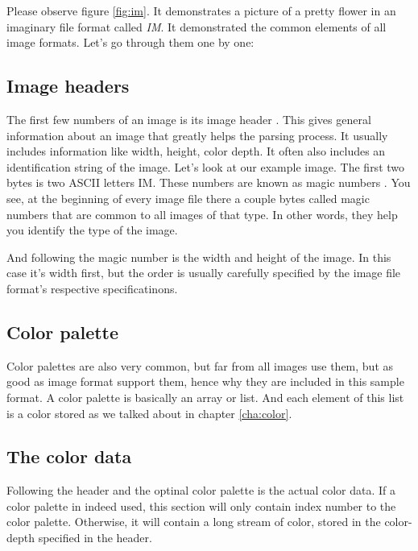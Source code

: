 \begin{refsection}
  Please observe figure \ref{fig:im}. It demonstrates a picture of a
  pretty flower in an imaginary
  file format called \textit{IM}. It demonstrated the common elements
  of all image formats. Let's go through them one by one:

  \subsection{Image headers}
  \label{sec:image-headers}

  The first few numbers of an image is its image header . This gives general information about an image that
  greatly helps the parsing process. It usually includes information
  like width, height, color depth. It often also includes an
  identification string of the image. Let's look at our example
  image. The first two bytes is two ASCII letters IM. These numbers
  are known as magic numbers . You see, at the beginning of every image
  file there a couple bytes called magic numbers that are common to
  all images of that type. In other words, they help you identify the
  type of the image.

  And following the magic number is the width and height of the
  image. In this case it's width first, but the order is usually
  carefully specified by the image file format's respective
  specificatinons.

  \subsection{Color palette}
  \label{sec:color-pallete}

  Color palettes  are also very common, but far
  from all images use them, but as good as image format support them,
  hence why they are included in this sample format. A color palette
  is basically an array or list. And each element of this list is a
  color stored as we talked about in chapter \ref{cha:color}.

  \subsection{The color data}
  \label{sec:color-data}

  Following the header and the optinal color palette is the actual
  color data. If a color palette in indeed used, this section will
  only contain index number to the color palette. Otherwise, it will
  contain a long stream of color, stored in the color-depth specified
  in the header.


\end{refsection}
